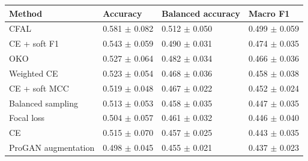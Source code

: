 \begin{tabular}{llll}
\toprule
Method & Accuracy & Balanced accuracy & Macro F1\\
\midrule
CFAL & \num{0.581} $\pm$ \num{0.082} & \num{0.512} $\pm$ \num{0.050} & \num{0.499} $\pm$ \num{0.059}\\
CE + soft F1 & \num{0.543} $\pm$ \num{0.059} & \num{0.490} $\pm$ \num{0.031} & \num{0.474} $\pm$ \num{0.035}\\
OKO & \num{0.527} $\pm$ \num{0.064} & \num{0.482} $\pm$ \num{0.034} & \num{0.466} $\pm$ \num{0.036}\\
Weighted CE & \num{0.523} $\pm$ \num{0.054} & \num{0.468} $\pm$ \num{0.036} & \num{0.458} $\pm$ \num{0.038}\\
CE + soft MCC & \num{0.519} $\pm$ \num{0.048} & \num{0.467} $\pm$ \num{0.022} & \num{0.452} $\pm$ \num{0.024}\\
Balanced sampling & \num{0.513} $\pm$ \num{0.053} & \num{0.458} $\pm$ \num{0.035} & \num{0.447} $\pm$ \num{0.035}\\
Focal loss & \num{0.504} $\pm$ \num{0.057} & \num{0.461} $\pm$ \num{0.032} & \num{0.446} $\pm$ \num{0.040}\\
CE & \num{0.515} $\pm$ \num{0.070} & \num{0.457} $\pm$ \num{0.025} & \num{0.443} $\pm$ \num{0.035}\\
ProGAN augmentation & \num{0.498} $\pm$ \num{0.045} & \num{0.455} $\pm$ \num{0.021} & \num{0.437} $\pm$ \num{0.023}\\
\bottomrule
\end{tabular}
